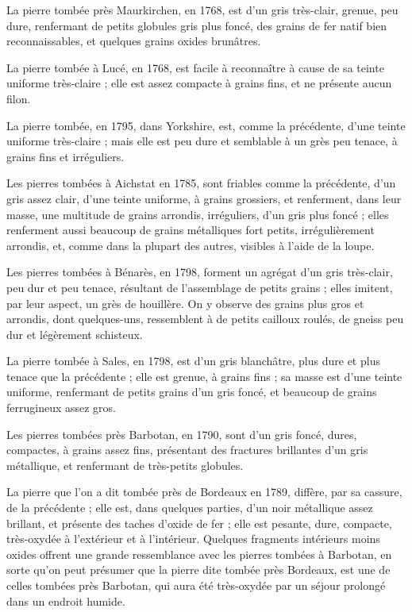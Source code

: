 \documentclass[a4paper, 12pt, oneside, french]{article}
\begin{document}
La pierre tombée près Maurkirchen, en 1768, est d'un gris très-clair, grenue, peu dure, renfermant de petits globules gris plus foncé, des grains de fer natif bien reconnaissables, et quelques grains oxides brunâtres.

La pierre tombée à Lucé, en 1768, est facile à reconnaître à cause de sa teinte uniforme très-claire ; elle est assez compacte à grains fins, et ne présente aucun filon.

La pierre tombée, en 1795, dans Yorkshire, est, comme la précédente, d'une teinte uniforme très-claire ; mais elle est peu dure et semblable à un grès peu tenace, à grains fins et irréguliers.

Les pierres tombées à Aichstat en 1785, sont friables comme la précédente, d'un gris assez clair, d'une teinte uniforme, à grains grossiers, et renferment, dans leur masse, une multitude de grains arrondis, irréguliers, d'un gris plus foncé ; elles renferment aussi beaucoup de grains métalliques fort petits, irrégulièrement arrondis, et, comme dans la plupart des autres, visibles à l'aide de la loupe.

Les pierres tombées à Bénarès, en 1798, forment un agrégat d'un gris très-clair, peu dur et peu tenace, résultant de l'assemblage de petits grains ; elles imitent, par leur aspect, un grès de houillère. On y observe des grains plus gros et arrondis, dont quelques-uns, ressemblent à de petits cailloux roulés, de gneiss peu dur et légèrement schisteux.

La pierre tombée à Sales, en 1798, est d'un gris blanchâtre, plus dure et plus tenace que la précédente ; elle est grenue, à grains fins ; sa masse est d'une teinte uniforme, renfermant de petits grains d'un gris foncé, et beaucoup de grains ferrugineux assez gros.

Les pierres tombées près Barbotan, en 1790, sont d'un gris foncé, dures, compactes, à grains assez fins, présentant des fractures brillantes d'un gris métallique, et renfermant de très-petits globules.

La pierre que l'on a dit tombée près de Bordeaux en 1789, diffère, par sa cassure, de la précédente ; elle est, dans quelques parties, d'un noir métallique assez brillant, et présente des taches d'oxide de fer ; elle est pesante, dure, compacte, très-oxydée à l'extérieur et à l'intérieur. Quelques fragments intérieurs moins oxides offrent une grande ressemblance avec les pierres tombées à Barbotan, en sorte qu'on peut présumer que la pierre dite tombée près Bordeaux, est une de celles tombées près Barbotan, qui aura été très-oxydée par un séjour prolongé dans un endroit humide.
\end{document}
